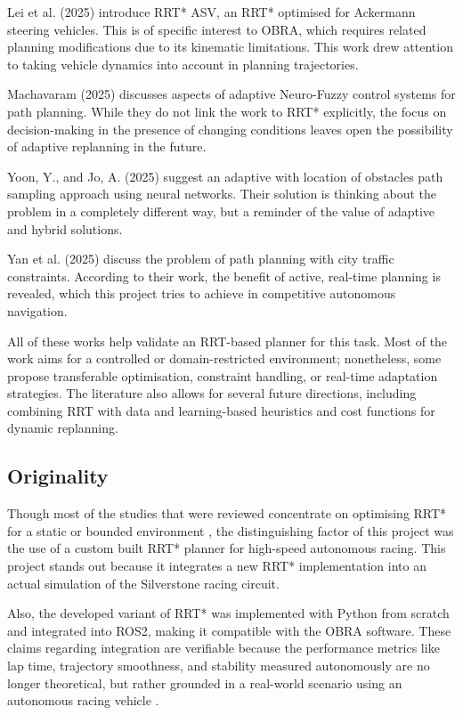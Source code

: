 \documentclass[a4paper,11pt]{report}
\begin{document}
Lei et al. (2025) introduce RRT* ASV, an RRT* optimised for Ackermann steering vehicles. This is of specific interest to OBRA, which requires related planning modifications due to its kinematic limitations. This work drew attention to taking vehicle dynamics into account in planning trajectories.
\cite{reference11}

Machavaram (2025) discusses aspects of adaptive Neuro-Fuzzy control systems for path planning. While they do not link the work to RRT* explicitly, the focus on decision-making in the presence of changing conditions leaves open the possibility of adaptive replanning in the future.
\cite{reference12}

Yoon, Y., and Jo, A. (2025) suggest an adaptive with location of obstacles path sampling approach using neural networks. Their solution is thinking about the problem in a completely different way, but a reminder of the value of adaptive and hybrid solutions. \cite{reference13}

Yan et al. (2025) discuss the problem of path planning with city traffic constraints. According to their work, the benefit of active, real-time planning is revealed, which this project tries to achieve in competitive autonomous navigation.
\cite{reference14}

All of these works help validate an RRT-based planner for this task. Most of the work aims for a controlled or domain-restricted environment; nonetheless, some propose transferable optimisation, constraint handling, or real-time adaptation strategies. The literature also allows for several future directions, including combining RRT with data and learning-based heuristics and cost functions for dynamic replanning.


\subsection{Originality}
Though most of the studies that were reviewed concentrate on optimising RRT* for a static or bounded environment \cite{reference3, reference4, reference5}, 
the distinguishing factor of this project was the use of a custom built RRT* planner for high-speed autonomous racing. 
This project stands out because it integrates a new RRT* implementation into an actual simulation of the Silverstone racing 
circuit.

Also, the developed variant of RRT* was implemented with Python from scratch and integrated into ROS2, making 
it compatible with the OBRA software. These claims regarding integration are verifiable because the performance 
metrics like lap time, trajectory smoothness, and stability measured autonomously are no longer theoretical, 
but rather grounded in a real-world scenario using an autonomous racing vehicle \cite{reference2}.
\end{document}
